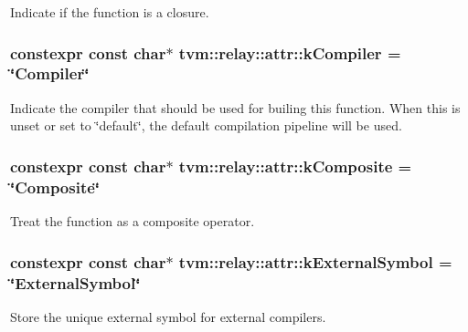 Indicate if the function is a closure. 

\subsubsection[{\texorpdfstring{k\+Compiler}{kCompiler}}]{\setlength{\rightskip}{0pt plus 5cm}constexpr const char$\ast$ tvm\+::relay\+::attr\+::k\+Compiler = \char`\"{}Compiler\char`\"{}}\hypertarget{namespacetvm_1_1relay_1_1attr_a0cc8498ce2c4e0ffd3b2814f65799148}{}\label{namespacetvm_1_1relay_1_1attr_a0cc8498ce2c4e0ffd3b2814f65799148}


Indicate the compiler that should be used for builing this function. When this is unset or set to \char`\"{}default\char`\"{}, the default compilation pipeline will be used. 

\subsubsection[{\texorpdfstring{k\+Composite}{kComposite}}]{\setlength{\rightskip}{0pt plus 5cm}constexpr const char$\ast$ tvm\+::relay\+::attr\+::k\+Composite = \char`\"{}Composite\char`\"{}}\hypertarget{namespacetvm_1_1relay_1_1attr_a04f8f1b117293d37651f8c81135802a2}{}\label{namespacetvm_1_1relay_1_1attr_a04f8f1b117293d37651f8c81135802a2}


Treat the function as a composite operator. 

\subsubsection[{\texorpdfstring{k\+External\+Symbol}{kExternalSymbol}}]{\setlength{\rightskip}{0pt plus 5cm}constexpr const char$\ast$ tvm\+::relay\+::attr\+::k\+External\+Symbol = \char`\"{}External\+Symbol\char`\"{}}\hypertarget{namespacetvm_1_1relay_1_1attr_ae61f67fa7105e9ef262770ccc840cdb4}{}\label{namespacetvm_1_1relay_1_1attr_ae61f67fa7105e9ef262770ccc840cdb4}


Store the unique external symbol for external compilers. 

